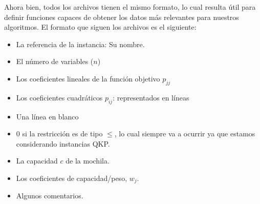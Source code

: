 Ahora bien, todos los archivos tienen el mismo formato, lo cual resulta útil para definir funciones capaces de obtener los datos más relevantes para nuestros algoritmos. 
El formato que siguen los archivos es el siguiente:
\begin{itemize}
	\item La referencia de la instancia: Su nombre.
	\item El número de variables ($n$)
	\item Los coeficientes lineales de la función objetivo $p_{jj}$
	\item Los coeficientes cuadráticos $p_{ij}$: representados en líneas
	\item Una línea en blanco
	\item 0 si la restricción es de tipo $\leq$, lo cual siempre va a ocurrir ya que estamos considerando instancias QKP.
	\item La capacidad $c$ de la mochila.
	\item Los coeficientes de capacidad/peso, $w_j$.
	\item Algunos comentarios.
\end{itemize}

